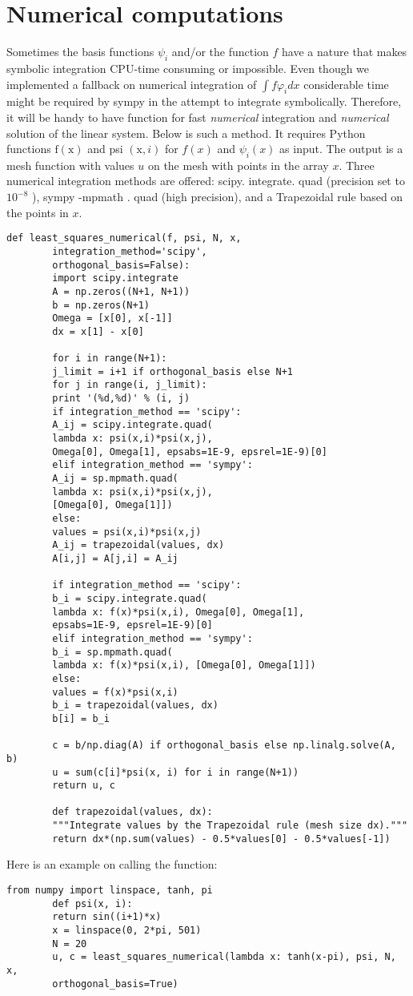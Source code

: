 \documentclass[../main.tex]{subfiles}
\begin{document}
	\section[Numerical computations]{Numerical computations}
	\label{sec:sec_2_9}
	\noindent Sometimes the basis functions $\psi_{i}$ and/or the function $f$ have a nature that makes symbolic integration CPU-time consuming or impossible. Even though we implemented a fallback on numerical integration of $\int f \varphi_{i} d x$ considerable time might be required by sympy in the attempt to integrate symbolically. Therefore, it will be handy to have function for fast \textit{numerical} integration and \textit{numerical} solution of the linear system. Below is such a method. It requires Python functions $\mathrm{f}(\mathrm{x})$ and psi $(\mathrm{x}, i)$ for $f(x)$ and $\psi_{i}(x)$ as input. The output is a mesh function with values $u$ on the mesh with points in the array $x$. Three numerical integration methods are offered: scipy. integrate. quad (precision set to $10^{-8}$ ), sympy -mpmath . quad (high precision), and a Trapezoidal rule based on the points in $x$.
	\begin{lstlisting}[numbers=none]
		def least_squares_numerical(f, psi, N, x,
		integration_method='scipy',
		orthogonal_basis=False):
		import scipy.integrate
		A = np.zeros((N+1, N+1))
		b = np.zeros(N+1)
		Omega = [x[0], x[-1]]
		dx = x[1] - x[0]
		
		for i in range(N+1):
		j_limit = i+1 if orthogonal_basis else N+1
		for j in range(i, j_limit):
		print '(%d,%d)' % (i, j)
		if integration_method == 'scipy':
		A_ij = scipy.integrate.quad(
		lambda x: psi(x,i)*psi(x,j),
		Omega[0], Omega[1], epsabs=1E-9, epsrel=1E-9)[0]
		elif integration_method == 'sympy':
		A_ij = sp.mpmath.quad(
		lambda x: psi(x,i)*psi(x,j),
		[Omega[0], Omega[1]])
		else:
		values = psi(x,i)*psi(x,j)
		A_ij = trapezoidal(values, dx)
		A[i,j] = A[j,i] = A_ij
		
		if integration_method == 'scipy':
		b_i = scipy.integrate.quad(			
		lambda x: f(x)*psi(x,i), Omega[0], Omega[1],
		epsabs=1E-9, epsrel=1E-9)[0]
		elif integration_method == 'sympy':
		b_i = sp.mpmath.quad(
		lambda x: f(x)*psi(x,i), [Omega[0], Omega[1]])
		else:
		values = f(x)*psi(x,i)
		b_i = trapezoidal(values, dx)
		b[i] = b_i
		
		c = b/np.diag(A) if orthogonal_basis else np.linalg.solve(A, b)
		u = sum(c[i]*psi(x, i) for i in range(N+1))
		return u, c
		
		def trapezoidal(values, dx):
		"""Integrate values by the Trapezoidal rule (mesh size dx)."""
		return dx*(np.sum(values) - 0.5*values[0] - 0.5*values[-1])
	\end{lstlisting}
	Here is an example on calling the function:
	\begin{lstlisting}[numbers=none]
		from numpy import linspace, tanh, pi
		def psi(x, i):
		return sin((i+1)*x)
		x = linspace(0, 2*pi, 501)
		N = 20
		u, c = least_squares_numerical(lambda x: tanh(x-pi), psi, N, x,
		orthogonal_basis=True)
	\end{lstlisting}
\end{document}
